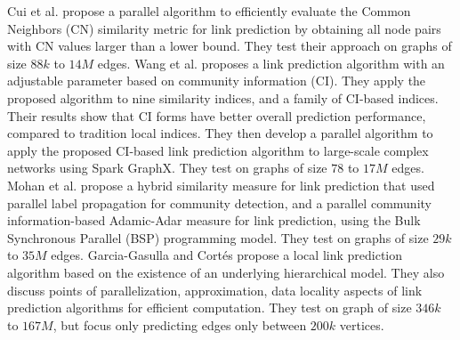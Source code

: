 Cui et al. \cite{cui2016bounded} propose a parallel algorithm to efficiently evaluate the Common Neighbors (CN) similarity metric for link prediction by obtaining all node pairs with CN values larger than a lower bound. They test their approach on graphs of size $88k$ to $14M$ edges.
Wang et al. \cite{wang2019link} proposes a link prediction algorithm with an adjustable parameter based on community information (CI). They apply the proposed algorithm to nine similarity indices, and a family of CI-based indices. Their results show that CI forms have better overall prediction performance, compared to tradition local indices. They then develop a parallel algorithm to apply the proposed CI-based link prediction algorithm to large-scale complex networks using Spark GraphX. They test on graphs of size $78$ to $17M$ edges.
Mohan et al. \cite{mohan2017scalable} propose a hybrid similarity measure for link prediction that used parallel label propagation for community detection, and a parallel community information-based Adamic-Adar measure for link prediction, using the Bulk Synchronous Parallel (BSP) programming model. They test on graphs of size $29k$ to $35M$ edges.
Garcia-Gasulla and Cort{\'e}s \cite{garcia2014link} propose a local link prediction algorithm based on the existence of an underlying hierarchical model. They also discuss points of parallelization, approximation, data locality aspects of link prediction algorithms for efficient computation. They test on graph of size $346k$ to $167M$, but focus only predicting edges only between $200k$ vertices.


